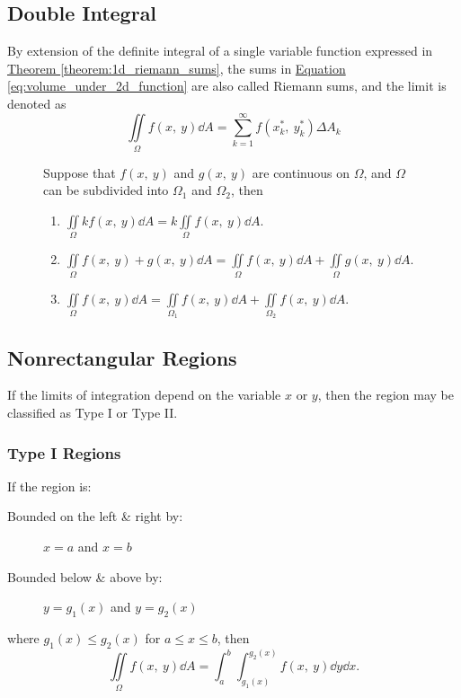 \documentclass{article}
\begin{document}
\subsection{Double Integral}
\begin{definition}
    By extension of the definite integral of a single variable function expressed in
    \hyperref[theorem:1d_riemann_sums]{Theorem \ref{theorem:1d_riemann_sums}}, the sums in
    \hyperref[eq:volume_under_2d_function]{Equation \ref{eq:volume_under_2d_function}}
    are also called Riemann sums, and the limit is denoted as
    \begin{equation*}
        \iint\limits_{\Omega} f(x,\: y)  \dd{A}
        = \sum_{k=1}^{\infty} f(x_k^\ast,\: y_k^\ast) \Delta A_k
    \end{equation*}
\end{definition}
\begin{figure}[H]
	\begin{mdframed}[style=exampledefault,frametitle={Properties of Double Integrals}]
		\begin{theorem}
            Suppose that $f(x,\: y) $ and $g(x,\: y)$ are continuous on $\Omega$,
            and $\Omega$ can be subdivided into $\Omega_1$ and $\Omega_2$, then
			\begin{enumerate}[label=\normalfont\alph*)]
				\item $\displaystyle\iint\limits_\Omega kf(x,\: y) \dd{A}
                    = k\iint\limits_\Omega f(x,\: y) \dd{A}$.
				\item $\displaystyle\iint\limits_\Omega f(x,\: y) + g(x,\: y) \dd{A}
                    = \iint\limits_\Omega f(x,\: y) \dd{A} + \iint\limits_\Omega g(x,\: y) \dd{A}$.
                \item $\displaystyle\iint\limits_\Omega f(x,\: y) \dd{A}
                    = \iint\limits_{\Omega_1} f(x,\: y) \dd{A} + \iint\limits_{\Omega_2} f(x,\: y) \dd{A}$.
			\end{enumerate}
		\end{theorem}
	\end{mdframed}
\end{figure}
\subsection{Nonrectangular Regions}
If the limits of integration depend on the variable $x$ or $y$, then the region 
may be classified as Type I or Type II.
\subsubsection{Type I Regions}
If the region is: 
\begin{description}
    \item[Bounded on the left \& right by:] $x=a$ and $x=b$
    \item[Bounded below \& above by:] $y=g_1(x)$ and $y=g_2(x)$
\end{description}
where $g_1(x) \leq g_2(x)$ for $a \leq x \leq b$, then
\begin{equation*}
    \iint\limits_{\Omega} f(x,\: y) \dd{A} = \int_a^b\int_{g_1(x)}^{g_2(x)} f(x,\: y) \dd{y} \dd{x}.
\end{equation*}
\end{document}
